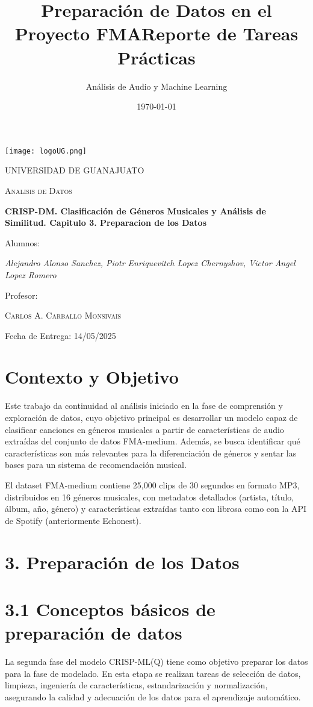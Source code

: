 \documentclass{article}
\title{Preparación de Datos en el Proyecto FMA}
\author{Análisis de Audio y Machine Learning}
\date{\today}
\title{Reporte de Tareas Prácticas}
\newcommand{\institucion}{UNIVERSIDAD DE GUANAJUATO}
\newcommand{\materia}{Analisis de Datos}
\newcommand{\profesor}{Carlos A. Carballo Monsivais}
\newcommand{\nombreTarea}{CRISP-DM. Clasificación de Géneros Musicales y Análisis de Similitud. Capitulo 3. Preparacion de los Datos}
\newcommand{\estudiante}{Alejandro Alonso Sanchez, Piotr Enriquevitch Lopez Chernyshov, Victor Angel Lopez Romero}
\newcommand{\fechaEntrega}{Fecha de Entrega: 14/05/2025}
\begin{document}
\begin{titlepage}
    \centering
    \texttt{[image: logoUG.png]}\par\vspace{1cm}
    {\scshape\LARGE \institucion \par}
    \vspace{1cm}
    {\scshape\Large \materia \par}
    \vspace{1.5cm}
    {\scshape\bfseries \numeroTarea \par}
    \vspace{1.5cm}
    {\huge\bfseries \nombreTarea \par}
    \vspace{2cm}
    Alumnos: \par
    {\Large\itshape \estudiante \par}
    \vfill
    Profesor:\par
    \textsc{\profesor}
    \vfill
    {\large \fechaEntrega\par}
\end{titlepage}

\section*{Contexto y Objetivo}
Este trabajo da continuidad al análisis iniciado en la fase de comprensión y exploración de datos, cuyo objetivo principal es desarrollar un modelo capaz de clasificar canciones en géneros musicales a partir de características de audio extraídas del conjunto de datos FMA-medium. Además, se busca identificar qué características son más relevantes para la diferenciación de géneros y sentar las bases para un sistema de recomendación musical.

El dataset FMA-medium contiene 25,000 clips de 30 segundos en formato MP3, distribuidos en 16 géneros musicales, con metadatos detallados (artista, título, álbum, año, género) y características extraídas tanto con librosa como con la API de Spotify (anteriormente Echonest).

\section*{3. Preparación de los Datos}

\section*{3.1 Conceptos básicos de preparación de datos}
La segunda fase del modelo CRISP-ML(Q) tiene como objetivo preparar los datos para la fase de modelado. En esta etapa se realizan tareas de selección de datos, limpieza, ingeniería de características, estandarización y normalización, asegurando la calidad y adecuación de los datos para el aprendizaje automático. 
\end{document}
